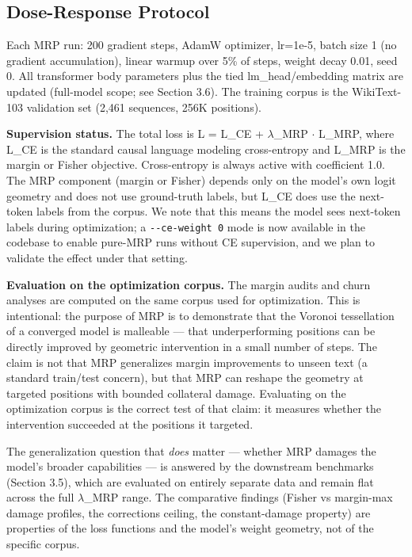 \documentclass[
  11pt,
]{article}
\begin{document}
\hypertarget{dose-response-protocol}{%
\subsection{Dose-Response Protocol}\label{dose-response-protocol}}

Each MRP run: 200 gradient steps, AdamW optimizer, lr=1e-5, batch size 1
(no gradient accumulation), linear warmup over 5\% of steps, weight
decay 0.01, seed 0. All transformer body parameters plus the tied
lm\_head/embedding matrix are updated (full-model scope; see Section
3.6). The training corpus is the WikiText-103 validation set (2,461
sequences, 256K positions).

\textbf{Supervision status.} The total loss is L = L\_CE + $\lambda$\_MRP $\cdot$
L\_MRP, where L\_CE is the standard causal language modeling
cross-entropy and L\_MRP is the margin or Fisher objective.
Cross-entropy is always active with coefficient 1.0. The MRP component
(margin or Fisher) depends only on the model's own logit geometry and
does not use ground-truth labels, but L\_CE does use the next-token
labels from the corpus. We note that this means the model sees
next-token labels during optimization; a \texttt{-\/-ce-weight\ 0} mode
is now available in the codebase to enable pure-MRP runs without CE
supervision, and we plan to validate the effect under that setting.

\textbf{Evaluation on the optimization corpus.} The margin audits and
churn analyses are computed on the same corpus used for optimization.
This is intentional: the purpose of MRP is to demonstrate that the
Voronoi tessellation of a converged model is malleable --- that
underperforming positions can be directly improved by geometric
intervention in a small number of steps. The claim is not that MRP
generalizes margin improvements to unseen text (a standard train/test
concern), but that MRP can reshape the geometry at targeted positions
with bounded collateral damage. Evaluating on the optimization corpus is
the correct test of that claim: it measures whether the intervention
succeeded at the positions it targeted.

The generalization question that \emph{does} matter --- whether MRP
damages the model's broader capabilities --- is answered by the
downstream benchmarks (Section 3.5), which are evaluated on entirely
separate data and remain flat across the full $\lambda$\_MRP range. The
comparative findings (Fisher vs margin-max damage profiles, the
corrections ceiling, the constant-damage property) are properties of the
loss functions and the model's weight geometry, not of the specific
corpus.
\end{document}
